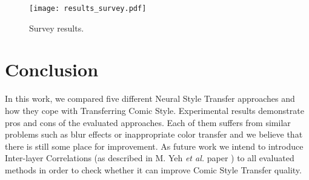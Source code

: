\documentclass{llncs}
\begin{document}
\begin{figure}[H]
  \centering
  \texttt{[image: results\_survey.pdf]}
  \caption{Survey results.\label{survey:results}}
\end{figure}

\section{Conclusion}

In this work, we compared five different Neural Style Transfer approaches and how they cope with Transferring Comic Style. Experimental results demonstrate pros and cons of the evaluated approaches. Each of them suffers from similar problems such as blur effects or inappropriate color transfer and we believe that there is still some place for improvement. As future work we intend to introduce Inter-layer Correlations (as described in M. Yeh \textit{et al.} paper \cite{inter:layer}) to all evaluated methods in order to check whether it can improve Comic Style Transfer quality. %
\end{document}
